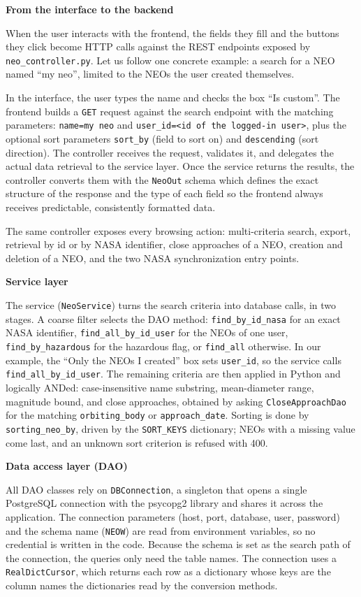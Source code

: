 \documentclass[
  french,
  11pt,
  a4paper,
]{report}
\begin{document}
\textbf{From the interface to the backend}

When the user interacts with the frontend, the fields they fill and the
buttons they click become HTTP calls against the REST endpoints exposed
by \texttt{neo\_controller.py}. Let us follow one concrete example: a
search for a NEO named ``my neo'', limited to the NEOs the user created
themselves.

In the interface, the user types the name and checks the box ``Is
custom''. The frontend builds a \texttt{GET} request against the search
endpoint with the matching parameters: \texttt{name=my\ neo} and
\texttt{user\_id=\textless{}id\ of\ the\ logged-in\ user\textgreater{}},
plus the optional sort parameters \texttt{sort\_by} (field to sort on)
and \texttt{descending} (sort direction). The controller receives the
request, validates it, and delegates the actual data retrieval to the
service layer. Once the service returns the results, the controller
converts them with the \texttt{NeoOut} schema which defines the exact
structure of the response and the type of each field so the frontend
always receives predictable, consistently formatted data.

The same controller exposes every browsing action: multi-criteria
search, export, retrieval by id or by NASA identifier, close approaches
of a NEO, creation and deletion of a NEO, and the two NASA
synchronization entry points.

\textbf{Service layer}

The service (\texttt{NeoService}) turns the search criteria into
database calls, in two stages. A coarse filter selects the DAO method:
\texttt{find\_by\_id\_nasa} for an exact NASA identifier,
\texttt{find\_all\_by\_id\_user} for the NEOs of one user,
\texttt{find\_by\_hazardous} for the hazardous flag, or
\texttt{find\_all} otherwise. In our example, the ``Only the NEOs I
created'' box sets \texttt{user\_id}, so the service calls
\texttt{find\_all\_by\_id\_user}. The remaining criteria are then
applied in Python and logically ANDed: case-insensitive name substring,
mean-diameter range, magnitude bound, and close approaches, obtained by
asking \texttt{CloseApproachDao} for the matching
\texttt{orbiting\_body} or \texttt{approach\_date}. Sorting is done by
\texttt{sorting\_neo\_by}, driven by the \texttt{SORT\_KEYS} dictionary;
NEOs with a missing value come last, and an unknown sort criterion is
refused with 400.

\textbf{Data access layer (DAO)}

All DAO classes rely on \texttt{DBConnection}, a singleton that opens a
single PostgreSQL connection with the psycopg2 library and shares it
across the application. The connection parameters (host, port, database,
user, password) and the schema name (\texttt{NEOW}) are read from
environment variables, so no credential is written in the code. Because
the schema is set as the search path of the connection, the queries only
need the table names. The connection uses a \texttt{RealDictCursor},
which returns each row as a dictionary whose keys are the column names
the dictionaries read by the conversion methods.
\end{document}
